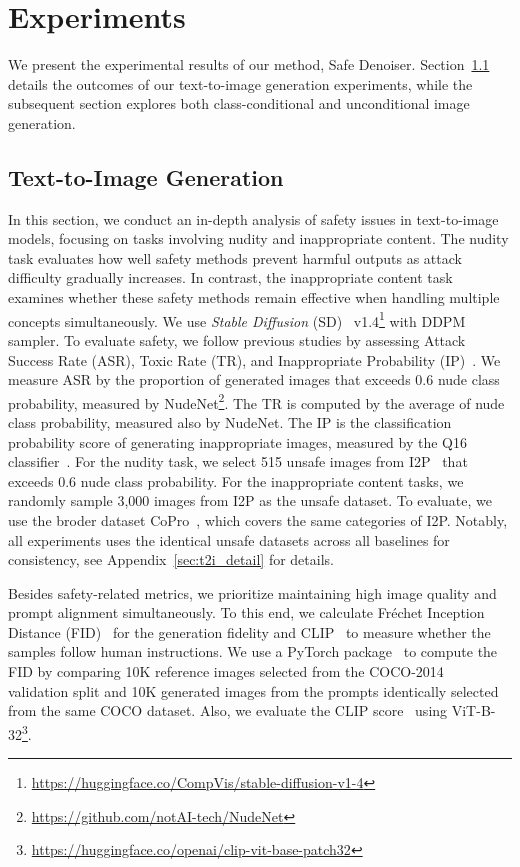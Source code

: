 \section{Experiments}
\label{sec:experiments}


We present the experimental results of our method, Safe Denoiser. Section~\ref{sec:t2i} details the outcomes of our text-to-image generation experiments, while the subsequent section explores both class-conditional and unconditional image generation.

\subsection{Text-to-Image Generation}
\label{sec:t2i}

In this section, we conduct an in-depth analysis of safety issues in text-to-image models, focusing on tasks involving nudity and inappropriate content. The nudity task evaluates how well safety methods prevent harmful outputs as attack difficulty gradually increases. In contrast, the inappropriate content task examines whether these safety methods remain effective when handling multiple concepts simultaneously. 
We use \textit{Stable Diffusion} (SD)~\cite{rombach2022high} v1.4\footnote{\url{https://huggingface.co/CompVis/stable-diffusion-v1-4}} with DDPM sampler. 
To evaluate safety, we follow previous studies by assessing Attack Success Rate (ASR), Toxic Rate (TR), and Inappropriate Probability (IP)~\cite{schramowski2023safe, yoon2024safree}. 
We measure ASR by the proportion of generated images that exceeds 0.6 nude class probability, measured by NudeNet\footnote{\url{https://github.com/notAI-tech/NudeNet}}. The TR is computed by the average of nude class probability, measured also by NudeNet. The IP is the classification probability score of generating inappropriate images, measured by the Q16 classifier~\citep{schramowski2022can}. For the nudity task, we select 515 unsafe images from I2P~\cite{schramowski2023safe} that exceeds 0.6 nude class probability. For the inappropriate content tasks, we randomly sample 3,000 images from I2P as the unsafe dataset. To evaluate, we use the broder dataset CoPro~\cite{liu2024latent}, which covers the same categories of I2P. Notably, all experiments uses the identical unsafe datasets across all baselines for consistency, see Appendix~\ref{sec:t2i_detail} for details. 

Besides safety-related metrics, we prioritize maintaining high image quality and prompt alignment simultaneously. To this end, we calculate Fr\'echet Inception Distance (FID)~\cite{heusel2017gans} for the generation fidelity and CLIP~\cite{radford2021learning} to measure whether the samples follow human instructions. We use a PyTorch package~\cite{Seitzer2020FID} to compute the FID by comparing 10K reference images selected from the COCO-2014~\cite{lin2014microsoft} validation split and 10K generated images from the prompts identically selected from the same COCO dataset. Also, we evaluate the CLIP score~\citep{radford2021learning} using ViT-B-32\footnote{\url{https://huggingface.co/openai/clip-vit-base-patch32}}.

